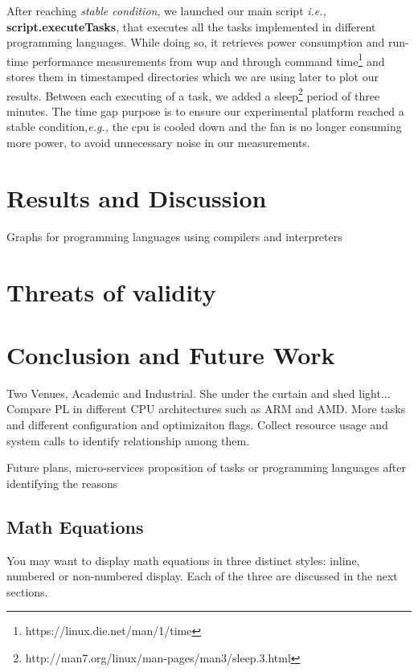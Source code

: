 After reaching \textit{stable condition}, we launched our main 
script \textit{i.e.,} \textbf{script.executeTasks}, that executes 
all the tasks implemented in different programming languages. 
While doing so, it retrieves power consumption and run-time 
performance measurements from {\sc wup} and through command 
time\footnote{https://linux.die.net/man/1/time} and stores them 
in timestamped directories which we are using later to plot 
our results. 
Between each executing of a task, we added a 
sleep\footnote{http://man7.org/linux/man-pages/man3/sleep.3.html} 
period of three minutes. 
The time gap purpose is to ensure our experimental platform 
reached a stable condition,\textit{e.g.,} the {\sc cpu} is cooled 
down and the fan is no longer consuming more power, to avoid 
unnecessary noise in our measurements.

\section{Results and Discussion}
Graphs for programming languages using compilers and interpreters

\section{Threats of validity}

\section{Conclusion and Future Work}
Two Venues, Academic and Industrial.
She under the curtain and shed light... 
Compare PL in different CPU architectures such as 
ARM and AMD.
More tasks and different configuration and optimizaiton 
flags.
Collect resource usage and system calls to identify 
relationship among them.

Future plans, micro-services proposition of tasks or 
programming languages after identifying the reasons

\subsection{Math Equations}
You may want to display math equations in three distinct styles:
inline, numbered or non-numbered display.  Each of
the three are discussed in the next sections.

